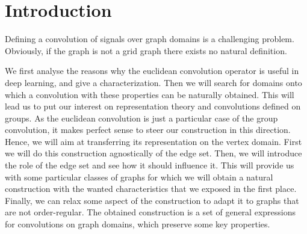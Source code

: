 \section*{Introduction}

Defining a convolution of signals over graph domains is a challenging problem. Obviously, if the graph is not a grid graph there exists no natural definition.

We first analyse the reasons why the euclidean convolution operator is useful in deep learning, and give a characterization. Then we will search for domains onto which a convolution with these properties can be naturally obtained. This will lead us to put our interest on representation theory and convolutions defined on groups. As the euclidean convolution is just a particular case of the group convolution, it makes perfect sense to steer our construction in this direction. Hence, we will aim at transferring its representation on the vertex domain. First we will do this construction agnostically of the edge set. Then, we will introduce the role of the edge set and see how it should influence it. This will provide us with some particular classes of graphs for which we will obtain a natural construction with the wanted characteristics that we exposed in the first place. Finally, we can relax some aspect of the construction to adapt it to graphs that are not order-regular. The obtained construction is a set of general expressions for convolutions on graph domains, which preserve some key properties.